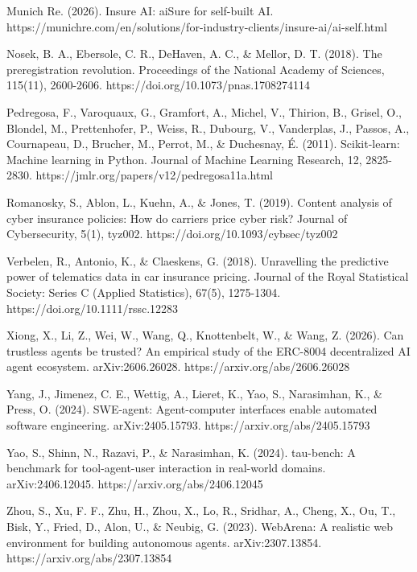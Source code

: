 \documentclass[
  11pt,
  a4paper,
]{article}
\begin{document}
Munich Re. (2026). Insure AI: aiSure for self-built AI.
https://munichre.com/en/solutions/for-industry-clients/insure-ai/ai-self.html

Nosek, B. A., Ebersole, C. R., DeHaven, A. C., \& Mellor, D. T. (2018).
The preregistration revolution. Proceedings of the National Academy of
Sciences, 115(11), 2600-2606. https://doi.org/10.1073/pnas.1708274114

Pedregosa, F., Varoquaux, G., Gramfort, A., Michel, V., Thirion, B.,
Grisel, O., Blondel, M., Prettenhofer, P., Weiss, R., Dubourg, V.,
Vanderplas, J., Passos, A., Cournapeau, D., Brucher, M., Perrot, M., \&
Duchesnay, É. (2011). Scikit-learn: Machine learning in Python. Journal
of Machine Learning Research, 12, 2825-2830.
https://jmlr.org/papers/v12/pedregosa11a.html

Romanosky, S., Ablon, L., Kuehn, A., \& Jones, T. (2019). Content
analysis of cyber insurance policies: How do carriers price cyber risk?
Journal of Cybersecurity, 5(1), tyz002.
https://doi.org/10.1093/cybsec/tyz002

Verbelen, R., Antonio, K., \& Claeskens, G. (2018). Unravelling the
predictive power of telematics data in car insurance pricing. Journal of
the Royal Statistical Society: Series C (Applied Statistics), 67(5),
1275-1304. https://doi.org/10.1111/rssc.12283

Xiong, X., Li, Z., Wei, W., Wang, Q., Knottenbelt, W., \& Wang, Z.
(2026). Can trustless agents be trusted? An empirical study of the
ERC-8004 decentralized AI agent ecosystem. arXiv:2606.26028.
https://arxiv.org/abs/2606.26028

Yang, J., Jimenez, C. E., Wettig, A., Lieret, K., Yao, S., Narasimhan,
K., \& Press, O. (2024). SWE-agent: Agent-computer interfaces enable
automated software engineering. arXiv:2405.15793.
https://arxiv.org/abs/2405.15793

Yao, S., Shinn, N., Razavi, P., \& Narasimhan, K. (2024). tau-bench: A
benchmark for tool-agent-user interaction in real-world domains.
arXiv:2406.12045. https://arxiv.org/abs/2406.12045

Zhou, S., Xu, F. F., Zhu, H., Zhou, X., Lo, R., Sridhar, A., Cheng, X.,
Ou, T., Bisk, Y., Fried, D., Alon, U., \& Neubig, G. (2023). WebArena: A
realistic web environment for building autonomous agents.
arXiv:2307.13854. https://arxiv.org/abs/2307.13854

\par\endgroup
\end{document}
